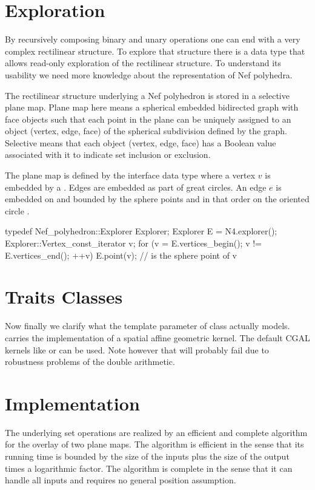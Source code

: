 \section{Exploration}

By recursively composing binary and unary operations one can end with
a very complex rectilinear structure. To explore that structure there
is a data type  that allows
read-only exploration of the rectilinear structure. To understand its
usability we need more knowledge about the representation of Nef
polyhedra.

The rectilinear structure underlying a Nef polyhedron is stored in a
selective plane map. Plane map here means a spherical embedded
bidirected graph with face objects such that each point in the plane
can be uniquely assigned to an object (vertex, edge, face) of the
spherical subdivision defined by the graph. Selective means that each
object (vertex, edge, face) has a Boolean value associated with it to
indicate set inclusion or exclusion.

The plane map is defined by the interface data type
 where a vertex $v$ is embedded by
a  . Edges are embedded as part of
great circles. An edge $e$ is embedded on  and bounded
by the sphere points  and 
in that order on the oriented circle .

\begin{ccExampleCode}
typedef Nef_polyhedron::Explorer Explorer;
Explorer E = N4.explorer();
Explorer::Vertex_const_iterator v;
for (v = E.vertices_begin(); v != E.vertices_end(); ++v)
  E.point(v); // is the sphere point of v
\end{ccExampleCode}


\section{Traits Classes}

Now finally we clarify what the template parameter of class
 actually models.  carries the
implementation of a spatial affine geometric kernel. The default CGAL
kernels like  or  can be used.
Note however that  will probably fail due to
robustness problems of the double arithmetic.

\section{Implementation}

The underlying set operations are realized by an efficient and
complete algorithm for the overlay of two plane maps. The algorithm is
efficient in the sense that its running time is bounded by the size of
the inputs plus the size of the output times a logarithmic factor. The
algorithm is complete in the sense that it can handle all inputs and
requires no general position assumption.




